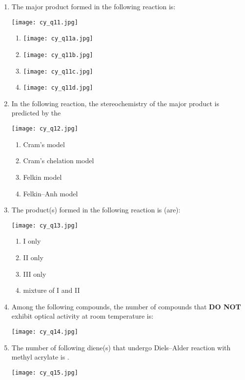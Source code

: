 \documentclass[12pt]{article}
\begin{document}
\begin{enumerate}[label=Q.\arabic*]
		\item The major product formed in the following reaction is:
		\begin{center}
		\texttt{[image: cy\_q11.jpg]}
		\end{center}
		\begin{multicols}{4}
		\begin{enumerate}[label=(\Alph*)]
		\item \texttt{[image: cy\_q11a.jpg]}
		\item \texttt{[image: cy\_q11b.jpg]}
		\item \texttt{[image: cy\_q11c.jpg]}
		\item \texttt{[image: cy\_q11d.jpg]}
		\end{enumerate}
		\end{multicols}
		\item In the following reaction, the stereochemistry of the major product is predicted by the
		\begin{center}
			\texttt{[image: cy\_q12.jpg]}
		\end{center}

		\begin{enumerate}[label=(\Alph*)]
		\item Cram’s model
		\item Cram’s chelation model
		\item Felkin model
		\item Felkin–Anh model
		\end{enumerate}

		\item The product(s) formed in the following reaction is (are):
			\begin{center}
			\texttt{[image: cy\_q13.jpg]}
			\end{center}

			\begin{enumerate}[label=(\Alph*)]
			\item I only
			\item II only
			\item III only
			\item mixture of I and II
			\end{enumerate}

			\item Among the following compounds, the number of compounds that \textbf{DO NOT} exhibit optical activity at room temperature is:
			\begin{center}
			\texttt{[image: cy\_q14.jpg]}
			\end{center}
			\item The number of following diene(s) that undergo Diels–Alder reaction with methyl acrylate is \underline{\hspace{2cm}}.
			\begin{center}
			\texttt{[image: cy\_q15.jpg]}
			\end{center}


\end{enumerate}
\end{document}
